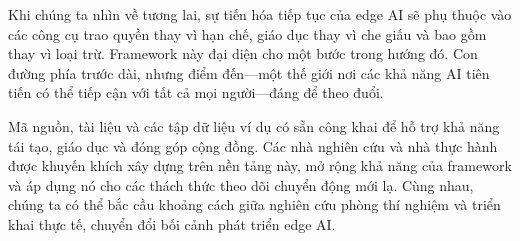 Khi chúng ta nhìn về tương lai, sự tiến hóa tiếp tục của edge AI sẽ phụ thuộc vào các công cụ trao quyền thay vì hạn chế, giáo dục thay vì che giấu và bao gồm thay vì loại trừ. Framework này đại diện cho một bước trong hướng đó. Con đường phía trước dài, nhưng điểm đến—một thế giới nơi các khả năng AI tiên tiến có thể tiếp cận với tất cả mọi người—đáng để theo đuổi.

Mã nguồn, tài liệu và các tập dữ liệu ví dụ có sẵn công khai để hỗ trợ khả năng tái tạo, giáo dục và đóng góp cộng đồng. Các nhà nghiên cứu và nhà thực hành được khuyến khích xây dựng trên nền tảng này, mở rộng khả năng của framework và áp dụng nó cho các thách thức theo dõi chuyển động mới lạ. Cùng nhau, chúng ta có thể bắc cầu khoảng cách giữa nghiên cứu phòng thí nghiệm và triển khai thực tế, chuyển đổi bối cảnh phát triển edge AI.
